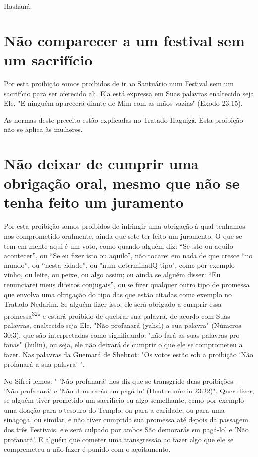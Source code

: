 Hashaná.

\section{Não comparecer a um festival sem um sacrifício}

Por esta proibição somos proibidos de ir ao Santuário num Festival sem
um sacrifício para ser oferecido ali. Ela está expressa em Suas palavras
enal­tecido seja Ele, "E ninguém aparecerá diante de Mim com as mãos
vazias" (Exodo 23:15).

As normas deste preceito estão explicadas no Tratado Haguigá. Esta
proibição não se aplica às mulheres.

\section{Não deixar de cumprir uma obrigação oral, mesmo que não se tenha 
feito um juramento}

Por esta proibição somos proibidos de infringir uma obrigação à qual
tenhamos nos comprometido oralmente, ainda que sete ter feito um
juramen­to. O que se tem em mente aqui é um voto, como quando alguém
diz: ``Se isto ou aquilo acontecer'', ou ``Se eu fizer isto ou aquilo'', não
tocarei em nada de que cresce ``no mundo'', ou ``nesta cidade'', ou "num
determinadQ tipo", como
por exemplo vinho, ou leite, ou peixe, ou algo assim; ou ainda se alguém
dis­ser: ``Eu renunciarei meus direitos conjugais'', ou se fizer qualquer
outro tipo de promessa que envolva uma obrigação do tipo das que estão
citadas como exemplo no Tratado Nedarim. Se alguém fizer isso, ele será
obrigado a cumprir essa promessa\textsuperscript{32}° e estará proibido
de quebrar sua palavra, de acordo com Suas palavras, enaltecido seja
Ele, "Não profanará (yahel) a sua palavra" (Números 30:3), que são
interpretadas como significando: "não fará as suas palavras pro­fanas"
(hulin), ou seja, ele não deixará de cumprir o que ele se comprometeu a
fazer. Nas.palavras da Guemará de Shebuot: "Os votos
estão sob a proibição `Não profanará a sua palavra' ".

No Sifrei lemos: " 'Não profanará' nos diz que se transgride duas
proi­bições --- 'Não profanará' e 'Não demorarás em pagá-lo'
(Deuteronômio 23:22)". Quer dizer, se alguém tiver prometido um
sacrifício ou algo semelhante, como por exemplo uma doação para o
tesouro do Templo, ou para a caridade, ou para uma sinagoga, ou similar,
e não tiver cumprido sua promessa até depois da passagem dos três
Festivais, ele será culpado por ambos São demorarás em pagá-lo' e 'Não
profanará'. E alguém que cometer uma transgressão ao fazer al­go que ele
se compremeteu a não fazer é punido com o açoitamento.


